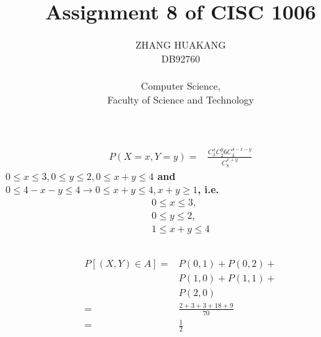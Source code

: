 \documentclass{article}
\title{Assignment 8 of CISC 1006}
\author{ZHANG HUAKANG \\ DB92760 \\ \\ Computer Science, \\Faculty of Science and Technology}
\begin{document}
    \maketitle
    \section{}
        \subsection{}
            \paragraph{
                \begin{equation*}
                    \begin{split}
                        P(X=x,Y=y)=&\frac{C_3^xC_2^y6C_3^{4-x-y}}{C_8^{x+y}}
                    \end{split}
                \end{equation*}
                $0\leq x\leq 3,0\leq y\leq 2, 0\leq x+y\leq 4$ and $0\leq 4-x-y\leq 4\rightarrow 0\leq x+y\leq 4,x+y\geq 1$,
                i.e.\begin{equation*}
                    \begin{split}
                        0\leq x\leq 3,\\0\leq y\leq 2,\\1\leq x+y\leq 4
                    \end{split}
                \end{equation*}
            }
        \subsection{}
            \paragraph{
                \begin{equation*}
                    \begin{split}
                        P[(X,Y)\in A]=&P(0,1)+P(0,2)+\\
                        &P(1,0)+P(1,1)+\\
                        &P(2,0)\\
                        =&\frac{2+3+3+18+9}{70}\\
                        =&\frac{1}{2}
                    \end{split}
                \end{equation*}
            }
\end{document}
